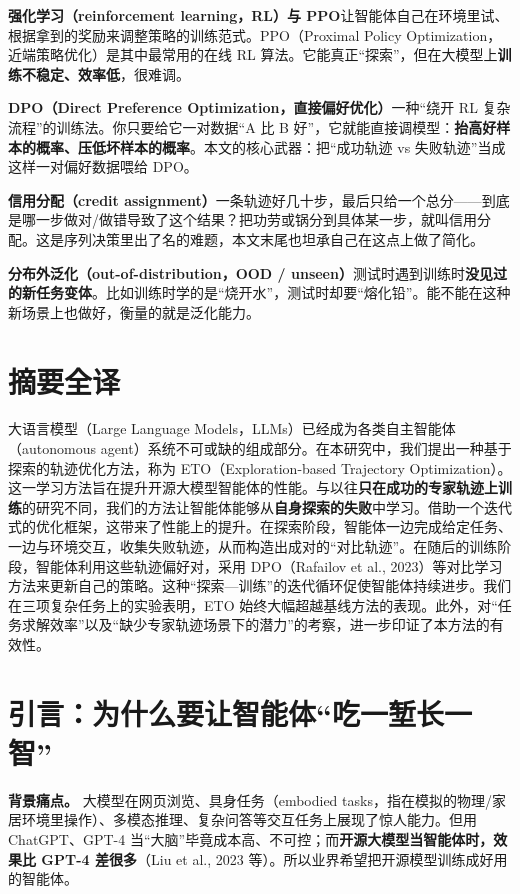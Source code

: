\documentclass[11pt,UTF8,fontset=fandol]{ctexart}
\newcommand{\zhcard}[2]{%
  \par\noindent\textbf{#1}\quad #2\par}
\begin{document}
\zhcard{强化学习（reinforcement learning，RL）与 PPO}{让智能体自己在环境里试、根据拿到的奖励来调整策略的训练范式。PPO（Proximal Policy Optimization，近端策略优化）是其中最常用的在线 RL 算法。它能真正“探索”，但在大模型上\textbf{训练不稳定、效率低}，很难调。}

\zhcard{DPO（Direct Preference Optimization，直接偏好优化）}{一种“绕开 RL 复杂流程”的训练法。你只要给它一对数据“A 比 B 好”，它就能直接调模型：\textbf{抬高好样本的概率、压低坏样本的概率}。本文的核心武器：把“成功轨迹 vs 失败轨迹”当成这样一对偏好数据喂给 DPO。}

\zhcard{信用分配（credit assignment）}{一条轨迹好几十步，最后只给一个总分——到底是哪一步做对/做错导致了这个结果？把功劳或锅分到具体某一步，就叫信用分配。这是序列决策里出了名的难题，本文末尾也坦承自己在这点上做了简化。}

\zhcard{分布外泛化（out-of-distribution，OOD / unseen）}{测试时遇到训练时\textbf{没见过的新任务变体}。比如训练时学的是“烧开水”，测试时却要“熔化铅”。能不能在这种新场景上也做好，衡量的就是泛化能力。}

\section{摘要全译}

大语言模型（Large Language Models，LLMs）已经成为各类自主智能体（autonomous agent）系统不可或缺的组成部分。在本研究中，我们提出一种基于探索的轨迹优化方法，称为 ETO（Exploration-based Trajectory Optimization）。这一学习方法旨在提升开源大模型智能体的性能。与以往\textbf{只在成功的专家轨迹上训练}的研究不同，我们的方法让智能体能够从\textbf{自身探索的失败}中学习。借助一个迭代式的优化框架，这带来了性能上的提升。在探索阶段，智能体一边完成给定任务、一边与环境交互，收集失败轨迹，从而构造出成对的“对比轨迹”。在随后的训练阶段，智能体利用这些轨迹偏好对，采用 DPO（Rafailov et al., 2023）等对比学习方法来更新自己的策略。这种“探索—训练”的迭代循环促使智能体持续进步。我们在三项复杂任务上的实验表明，ETO 始终大幅超越基线方法的表现。此外，对“任务求解效率”以及“缺少专家轨迹场景下的潜力”的考察，进一步印证了本方法的有效性。

\section{引言：为什么要让智能体“吃一堑长一智”}

\textbf{背景痛点。} 大模型在网页浏览、具身任务（embodied tasks，指在模拟的物理/家居环境里操作）、多模态推理、复杂问答等交互任务上展现了惊人能力。但用 ChatGPT、GPT-4 当“大脑”毕竟成本高、不可控；而\textbf{开源大模型当智能体时，效果比 GPT-4 差很多}（Liu et al., 2023 等）。所以业界希望把开源模型训练成好用的智能体。
\end{document}
